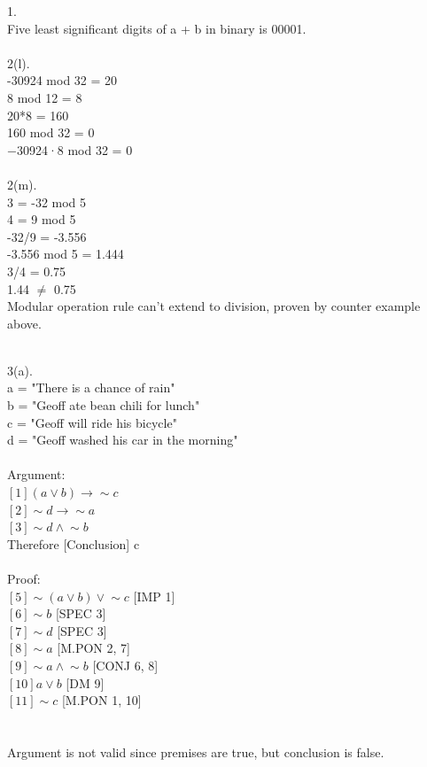 \documentclass[a4paper, 20pt]{article}
\def\lnot{\mathop{\sim}}
\begin{document}
\begin{question}{1.}
\\ Five least significant digits of a + b in binary is 00001.
\\
\\2(l).
\\ -30924 mod 32 = 20
\\ 8 mod 12 = 8
\\ 20*8 = 160
\\ 160 mod 32 = 0
\\−30924·8 mod 32 = 0
\\
\\2(m).
\\ 3 = -32 mod 5
\\ 4 = 9 mod 5
\\ -32/9 = -3.556
\\ -3.556 mod 5 = 1.444
\\ 3/4 = 0.75
\\ 1.44 $\neq$ 0.75
\\ Modular operation rule can't extend to division, proven by counter example above.
\newpage

\newpage
\\3(a).
\\ a = "There is a chance of rain"
\\ b = "Geoff ate bean chili for lunch"
\\ c = "Geoff will ride his bicycle"
\\ d = "Geoff washed his car in the morning"
\\
\\ Argument:
\\$[1] (a \lor b) \rightarrow \lnot c$
\\$[2] \lnot d \rightarrow \lnot a$
\\$[3] \lnot d \land \lnot b$
\\Therefore [Conclusion] c
\\
\\ Proof:
\\$[5] \lnot (a \lor b) \lor \lnot c$ [IMP 1]
\\$[6] \lnot b$ [SPEC 3]
\\$[7] \lnot d$ [SPEC 3]
\\$[8] \lnot a$ [M.PON 2, 7]
\\$[9] \lnot a \land \lnot b$ [CONJ 6, 8]
\\$[10] a \lor b$ [DM 9]
\\$[11] \lnot c$ [M.PON 1, 10] 
\\\boxed{}
\\
\\ Argument is not valid since premises are true, but conclusion is false.

\end{question}
\end{document}
